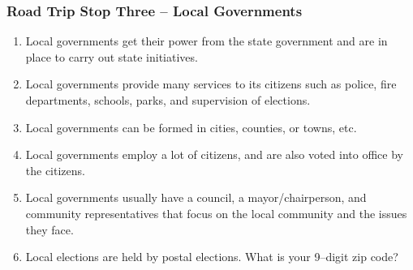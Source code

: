 \subsubsection*{Road Trip Stop Three – Local Governments}

\begin{enumerate}
    \item Local governments get their power from the state government and are in place to carry out state initiatives.
    \item Local governments provide many services to its citizens such as police, fire departments, schools, parks, and supervision of elections.
    \item Local governments can be formed in cities, counties, or towns, etc.
    \item Local governments employ a lot of citizens, and are also voted into office by the citizens.
    \item Local governments usually have a council, a mayor/chairperson, and community representatives that focus on the local community and the issues they face.
    \item Local elections are held by postal elections. What is your 9–digit zip code?
\end{enumerate}

\newpage
